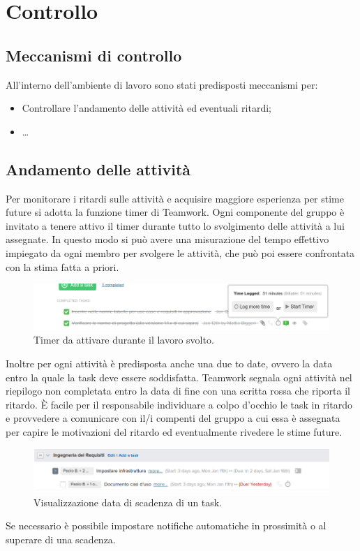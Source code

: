 \documentclass[a4paper]{report}
\begin{document}
		\section{Controllo}
			\subsection{Meccanismi di controllo}
				All'interno dell'ambiente di lavoro sono stati predisposti meccanismi per:
				\begin{itemize}
					\item Controllare l'andamento delle attività ed eventuali ritardi;
					\item \dots
				\end{itemize}
			\subsection{Andamento delle attività}
				Per monitorare i ritardi sulle attività e acquisire maggiore esperienza per stime future si adotta la 
				funzione timer di Teamwork. Ogni componente del gruppo è invitato a tenere attivo il timer durante 
				tutto lo svolgimento delle attività a lui assegnate. In questo modo si può avere una misurazione del 
				tempo effettivo impiegato da ogni membro per svolgere le attività, che può poi essere confrontata con 
				la stima fatta a priori.
				\begin{figure}[H]
					\centering
					\includegraphics[scale=0.4]{teamworkTimer}
					\caption{Timer da attivare durante il lavoro svolto.}
				\end{figure}
				Inoltre per ogni attività è predisposta anche una due to date, ovvero la data entro la quale la task deve 
				essere soddisfatta. Teamwork segnala ogni attività nel riepilogo non completata entro la data di fine con 
				una scritta rossa che riporta il ritardo. È facile per il responsabile individuare a colpo d'occhio le 
				task in ritardo e provvedere a comunicare con il/i compenti del gruppo a cui essa è assegnata per capire 
				le motivazioni del ritardo ed eventualmente rivedere le stime future.
				\begin{figure}[H]
					\centering
					\includegraphics[scale=0.4]{teamworkTaskinRitardo}
					\caption{Visualizzazione data di scadenza di un task.}
				\end{figure}
				Se necessario è possibile impostare notifiche automatiche in prossimità o al superare di una scadenza.
\end{document}
